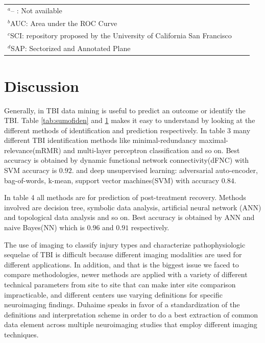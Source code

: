 \documentclass[runningheads]{llncs}
\begin{document}
\begin{table}[h]
{\begin{tabular}{p{2cm}@{\hskip 0.3in}p{4cm}@{\hskip 0.3in}p{4cm}@{\hskip 0.3in}p{3cm}@{\hskip 0.3in}p{3.5cm}}
\hline
\multicolumn{3}{l}{$^{a}$\footnotesize{-- : Not available}} \\
\multicolumn{3}{l}{$^{b}$\footnotesize{AUC: Area under the ROC Curve}} \\
\multicolumn{3}{l}{$^{c}$\footnotesize{SCI: repository proposed by the University of California San Francisco}}\\
\multicolumn{3}{l}{$^{d}$\footnotesize{SAP: Sectorized and Annotated Plane}}\\
\end{tabular}}
\label{tab:sumofrecovery}
\end{table}
\FloatBarrier

\section{Discussion}

Generally, in TBI data mining is useful to predict an outcome or identify the TBI. Table \ref{tab:sumofiden} and \ref{tab:sumofrecovery} makes it easy to understand by looking at the different methods of identification and prediction respectively. In table 3 many different TBI identification methods like minimal-redundancy maximal-relevance(mRMR) and multi-layer perceptron classification and so on. Best accuracy is obtained by dynamic functional network connectivity(dFNC) with SVM accuracy is $0.92$.\cite{marcano-cedeno_artificial_2013} and deep unsupervised learning: adversarial auto-encoder, bag-of-words, k-mean, support vector machines(SVM) with accuracy $0.84$\cite{minaee_mtbi_2019}.

In table 4 all methods are for prediction of post-treatment recovery. Methods involved are decision tree, symbolic data analysis, artificial neural network (ANN) and topological data analysis and so on. Best accuracy is obtained by ANN and naive Bayes(NN) which is $0.96$ and $0.91$ respectively.

The use of imaging to classify injury types and characterize pathophysiologic sequelae of TBI is difficult because different imaging modalities are used for different applications. In addition, and that is the biggest issue we faced to compare methodologies, newer methods are applied with a variety of different technical parameters from site to site that can make inter site comparison impracticable, and different centers use varying definitions for specific neuroimaging findings. Duhaime speaks in favor of a standardization of the definitions and interpretation scheme in order to do a best extraction of common data element across multiple neuroimaging studies that employ different imaging techniques\cite{duhaime_common_2010}.
\end{document}
